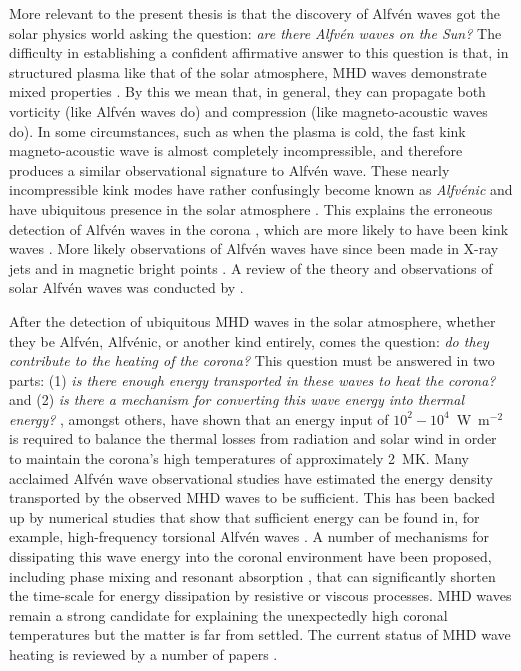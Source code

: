 More relevant to the present thesis is that the discovery of Alfv\'{e}n waves got the solar physics world asking the question: \textit{are there Alfv\'{e}n waves on the Sun?} The difficulty in establishing a confident affirmative answer to this question is that, in structured plasma like that of the solar atmosphere, MHD waves demonstrate mixed properties \citep{goo_etal09,goo_etal12,goo_etal19}. By this we mean that, in general, they can propagate both vorticity (like Alfv\'{e}n waves do) and compression (like magneto-acoustic waves do). In some circumstances, such as when the plasma is cold, the fast kink magneto-acoustic wave is almost completely incompressible, and therefore produces a similar observational signature to Alfv\'{e}n wave. These nearly incompressible kink modes have rather confusingly become known as \textit{Alfv\'{e}nic} and have ubiquitous presence in the solar atmosphere \citep{tom_etal07}. This explains the erroneous detection of Alfv\'{e}n waves in the corona \citep{tom_etal07}, which are more likely to have been kink waves \citep{van_etal08b,erd_etal08}. More likely observations of Alfv\'{e}n waves have since been made in X-ray jets \citep{cir_etal07} and in magnetic bright points \citep{jes_etal09}. A review of the theory and observations of solar Alfv\'{e}n waves was conducted by \cite{mat_etal13}.

After the detection of ubiquitous MHD waves in the solar atmosphere, whether they be Alfv\'{e}n, Alfv\'{e}nic, or another kind entirely, comes the question: \textit{do they contribute to the heating of the corona?} This question must be answered in two parts: (1) \textit{is there enough energy transported in these waves to heat the corona?} and (2) \textit{is there a mechanism for converting this wave energy into thermal energy?} \cite{wit_etal77}, amongst others, have shown that an energy input of $10^2 - 10^4$~W~m$^{-2}$ is required to balance the thermal losses from radiation and solar wind in order to maintain the corona's high temperatures of approximately 2~MK. Many acclaimed Alfv\'{e}n wave observational studies have estimated the energy density transported by the observed MHD waves to be sufficient. This has been backed up by numerical studies that show that sufficient energy can be found in, for example, high-frequency torsional Alfv\'{e}n waves \citep{sri_etal17}. A number of mechanisms for dissipating this wave energy into the coronal environment have been proposed, including phase mixing \citep{hey_etal83} and resonant absorption \citep{ion78}, that can significantly shorten the time-scale for energy dissipation by resistive or viscous processes. MHD waves remain a strong candidate for explaining the unexpectedly high coronal temperatures but the matter is far from settled. The current status of MHD wave heating is reviewed by a number of papers \citep{mat_etal13,dem_etal15}.

